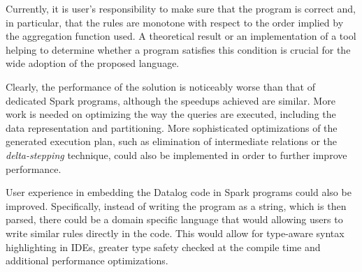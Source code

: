 Currently, it is user's responsibility to make sure that the program is correct and, in particular, that the rules are monotone with respect to the order implied by the aggregation function used. A theoretical result or an implementation of a tool helping to determine whether a program satisfies this condition is crucial for the wide adoption of the proposed language.

Clearly, the performance of the solution is noticeably worse than that of dedicated Spark programs, although the speedups achieved are similar. More work is needed on optimizing the way the queries are executed, including the data representation and partitioning. More sophisticated optimizations of the generated execution plan, such as elimination of intermediate relations or the \emph{delta-stepping} technique, could also be implemented in order to further improve performance.

User experience in embedding the Datalog code in Spark programs could also be improved. Specifically, instead of writing the program as a string, which is then parsed, there could be a domain specific language that would allowing users to write similar rules directly in the code. This would allow for type-aware syntax highlighting in IDEs, greater type safety checked at the compile time and additional performance optimizations.


